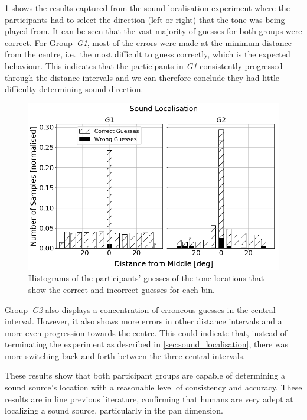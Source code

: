 \documentclass[acmsmall]{acmart}
\begin{document}
\cref{fig:sound-localisation} shows the results captured from the sound localisation experiment where the participants had to select the direction (left or right) that the tone was being played from. 
It can be seen that the vast majority of guesses for both groups were correct.
For Group~\textit{G1}, most of the errors were made at the minimum distance from the centre, i.e.\ the most difficult to guess correctly, which is the expected behaviour.
This indicates that the participants in \textit{G1} consistently progressed through the distance intervals and we can therefore conclude they had little difficulty determining sound direction.

\begin{figure}
  \centering
  \includegraphics[width=0.8\columnwidth]{figures/sound_localisation.png}
  \caption{Histograms of the participants' guesses of the tone locations that show the correct and incorrect guesses for each bin. }\label{fig:sound-localisation}
\end{figure}

Group~\textit{G2} also displays a concentration of erroneous guesses in the central interval.
However, it also shows more errors in other distance intervals and a more even progression towards the centre.
This could indicate that, instead of terminating the experiment as described in \cref{sec:sound_localisation}, there was more switching back and forth between the three central intervals. 

These results show that both participant groups are capable of determining a sound source's location with a reasonable level of consistency and accuracy.
These results are in line previous literature, confirming that humans are very adept at localizing a sound source, particularly in the pan dimension. 
\end{document}
